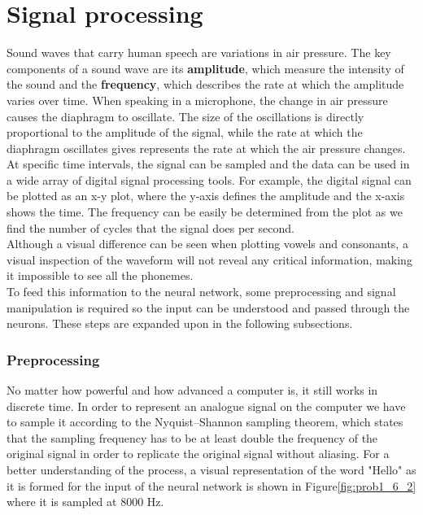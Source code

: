 \section{Signal processing}

Sound waves that carry human speech are variations in air pressure.
The key components of a sound wave are its \textbf{amplitude},
which measure the intensity of the sound and the \textbf{frequency}, which describes the rate at which the amplitude varies over time.
When speaking in a microphone,
the change in air pressure causes the diaphragm to oscillate.
The size of the oscillations is directly proportional to the amplitude of the signal,
while the rate at which the diaphragm oscillates gives represents the rate at which the air pressure changes.
At specific time intervals,
the signal can be sampled and the data can be used in a wide array of digital signal processing tools.
For example, the digital signal can be plotted as an x-y plot,
where the y-axis defines the amplitude and the x-axis shows the time.
The frequency can be easily be determined from the plot as we find the number of cycles that the signal does per second.\\

Although a visual difference can be seen when plotting vowels and consonants,
a visual inspection of the waveform will not reveal any critical information, making it impossible to see all the phonemes.\\

To feed this information to the neural network, some preprocessing and signal manipulation is required so the input can be understood and passed through the neurons.
These steps are expanded upon in the following subsections.

\subsubsection{ Preprocessing}

No matter how powerful and how advanced a computer is,
it still works in discrete time.
In order to represent an analogue signal on the computer we have to sample it according to the Nyquist–Shannon sampling theorem,
which states that the sampling frequency has to be at least double the frequency of the original signal in order to replicate the original signal without aliasing.
For a better understanding of the process, a visual representation of the word "Hello" as it is formed for the input of the neural network is shown in Figure\ref{fig:prob1_6_2} where it is sampled at 8000 Hz.



